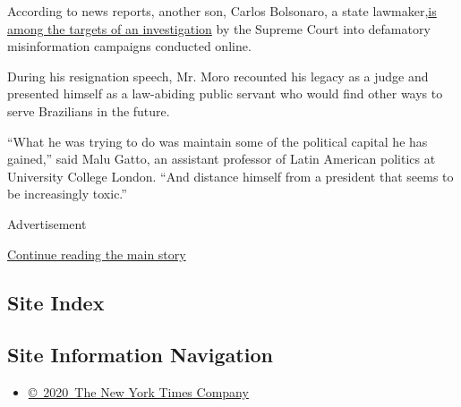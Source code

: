 According to news reports, another son, Carlos Bolsonaro, a state
lawmaker,\href{https://istoe.com.br/pf-teria-identificado-carlos-bolsonaro-como-mentor-de-fake-news-contra-stf/}{is
among the targets of an investigation} by the Supreme Court into
defamatory misinformation campaigns conducted online.

During his resignation speech, Mr. Moro recounted his legacy as a judge
and presented himself as a law-abiding public servant who would find
other ways to serve Brazilians in the future.

``What he was trying to do was maintain some of the political capital he
has gained,'' said Malu Gatto, an assistant professor of Latin American
politics at University College London. ``And distance himself from a
president that seems to be increasingly toxic.''

Advertisement

\protect\hyperlink{after-bottom}{Continue reading the main story}

\hypertarget{site-index}{%
\subsection{Site Index}\label{site-index}}

\hypertarget{site-information-navigation}{%
\subsection{Site Information
Navigation}\label{site-information-navigation}}

\begin{itemize}
\tightlist
\item
  \href{https://help.nytimes.com/hc/en-us/articles/115014792127-Copyright-notice}{©~2020~The
  New York Times Company}
\end{itemize}

